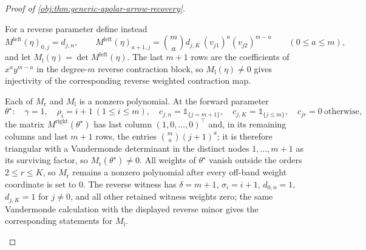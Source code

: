 \documentclass[11pt]{article}
\begin{document}
\begin{proof}[Proof of \cref{obj:thm:generic-apolar-arrow-recovery}]
\begin{enumerate}
For a reverse parameter define instead
\[
M^{\mathrm{left}}(\eta)_{0,j}=d_{j,n},
\qquad
M^{\mathrm{left}}(\eta)_{a+1,j}=\binom{m}{a}d_{j,K}\,(v_{j1})^{a}(v_{j2})^{m-a}
\qquad(0\le a\le m),
\]
and let \(M_{\mathrm l}(\eta)=\det M^{\mathrm{left}}(\eta)\).  The last \(m+1\) rows are the coefficients of \(x^ay^{m-a}\) in the degree-\(m\) reverse contraction block, so \(M_{\mathrm l}(\eta)\ne0\) gives injectivity of the corresponding reverse weighted contraction map.

Each of \(M_{\mathrm r}\) and \(M_{\mathrm l}\) is a nonzero polynomial.  At the forward parameter
\[
\theta^\star:\quad \gamma=1,
\quad \rho_i=i+1\ (1\le i\le m),
\quad c_{j,n}=\mathbb 1_{\{j=m+1\}},
\quad c_{j,K}=\mathbb 1_{\{j\le m\}},
\quad c_{jr}=0\ \text{otherwise},
\]
the matrix \(M^{\mathrm{right}}(\theta^\star)\) has last column \((1,0,\ldots,0)^{\top}\) and, in its remaining columns and last \(m+1\) rows, the entries \(\binom{m}{a}(j+1)^{a}\); it is therefore triangular with a Vandermonde determinant in the distinct nodes \(1,\ldots,m+1\) as its surviving factor, so \(M_{\mathrm r}(\theta^\star)\ne0\).  All weights of \(\theta^\star\) vanish outside the orders \(2\le r\le K\), so \(M_{\mathrm r}\) remains a nonzero polynomial after every off-band weight coordinate is set to \(0\).  The reverse witness has \(\delta=m+1\), \(\sigma_i=i+1\), \(d_{0,n}=1\), \(d_{j,K}=1\) for \(j\ne0\), and all other retained witness weights zero; the same Vandermonde calculation with the displayed reverse minor gives the corresponding statements for \(M_{\mathrm l}\).


\end{enumerate}
\end{proof}
\end{document}
